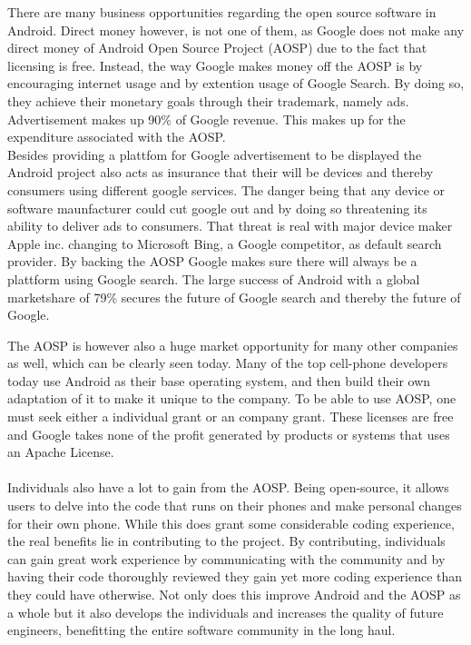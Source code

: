 \documentclass[conference]{IEEEtran}
\begin{document}
There are many business opportunities regarding the open source software in Android. Direct money however, is not one of them, as Google does not make any direct money of Android Open Source Project (AOSP) due to the fact that licensing is free.\cite{Money} Instead, the way Google makes money off the AOSP is by encouraging internet usage and by extention usage of Google Search. By doing so, they achieve their monetary goals through their trademark, namely ads. Advertisement makes up 90\% of Google revenue. \cite{google-revenue} This makes up for the expenditure associated with the AOSP. 
\\Besides providing a plattfom for Google advertisement to be displayed the Android project also acts as insurance that their will be devices and thereby consumers using different google services.\cite{moat} The danger being that any device or software maunfacturer could cut google out and by doing so threatening its ability to deliver ads to consumers. That threat is real with major device maker Apple inc. changing to Microsoft Bing, a Google competitor, as default search provider. \cite{siri-bing} By backing the AOSP Google makes sure there will always be a plattform using Google search. The large success of Android with a global marketshare of 79\% secures the future of Google search and thereby the future of Google. \cite{android-marketshare}


The AOSP is however also a huge market opportunity for many other companies as well, which can be clearly seen today. Many of the top cell-phone developers today use Android as their base operating system, and then build their own adaptation of it to make it unique to the company. To be able to use AOSP, one must seek either a individual grant or an company grant.\cite{android-licenses} These licenses are free and Google takes none of the profit generated by products or systems that uses an Apache License.\\
\\
Individuals also have a lot to gain from the AOSP. Being open-source, it allows users to delve into the code that runs on their phones and make personal changes for their own phone. While this does grant some considerable coding experience, the real benefits lie in contributing to the project. By contributing, individuals can gain great work experience by communicating with the community and by having their code thoroughly reviewed they gain yet more coding experience than they could have otherwise. Not only does this improve Android and the AOSP as a whole but it also develops the individuals and increases the quality of future engineers, benefitting the entire software community in the long haul. 
\end{document}
